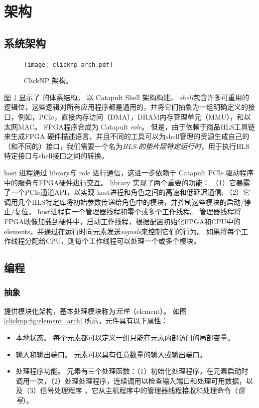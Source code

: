 \section{架构}
\label{clicknp:sec:architecture}

\subsection{系统架构}
\label{clicknp:subsec:sysarch}

\begin{figure}
\centering
\texttt{[image: clicknp-arch.pdf]}
\caption{ClickNP 架构。}
\label{clicknp:fig:clicknp}
\end{figure}

图 \ref{clicknp:fig:clicknp} 显示了 \name 的体系结构。
\name 以 Catapult Shell 架构构建\cite {putnam2014reconfigurable}。
\textit {shell}包含许多可重用的逻辑位，这些逻辑对所有应用程序都是通用的，并将它们抽象为一组明确定义的接口，例如，PCIe，直接内存访问（DMA），DRAM内存管理单元（MMU），和以太网MAC。
\name FPGA程序合成为 Catapult \textit {role}。
但是，由于\name 依赖于商品HLS工具链来生成FPGA 硬件描述语言，并且不同的工具可以为shell管理的资源生成自己的（和不同的）接口，我们需要一个名为\textit {HLS-的垫片层特定运行时}，用于执行HLS特定接口与shell接口之间的转换。

\name{} host 进程通过 \name{} library与 \name{} role 进行通信，这进一步依赖于 Catapult PCIe 驱动程序中的服务与FPGA硬件进行交互。
\name{} library 实现了两个重要的功能：
（1）它暴露了一个PCIe通道API，以实现 \name{} host进程和角色之间的高速和低延迟通信;
（2）它调用几个HLS特定库将初始参数传递给角色中的模块，并控制这些模块的启动/停止/复位。
\name{} host进程有一个管理器线程和零个或多个工作线程。
管理器线程将FPGA映像加载到硬件中，启动工作线程，根据配置初始化FPGA和CPU中的\name elements，并通过在运行时向元素发送\textit {signals}来控制它们的行为。
如果将每个工作线程分配给CPU，则每个工作线程可以处理一个或多个模块。

\subsection{\name 编程}

\subsubsection{抽象}

\name 提供模块化架构，基本处理模块称为\textit{元件}（element）。
如图 \ref{clicknp:fig:element_arch} 所示，\name 元件具有以下属性：
\begin{itemize}
\item 本地状态。 每个元素都可以定义一组只能在元素内部访问的局部变量。
\item 输入和输出端口。 元素可以具有任意数量的输入或输出端口。
\item 处理程序功能。 元素有三个处理函数：（1）初始化处理程序，在元素启动时调用一次，（2）处理处理程序，连续调用以检查输入端口和处理可用数据，以及（3）信号处理程序 ，它从主机程序中的管理器线程接收和处理命令（\textit {信号}）。
\end{itemize}

